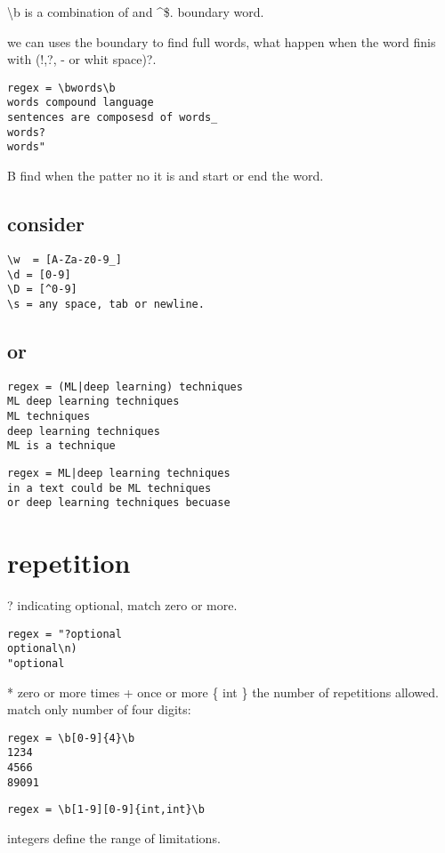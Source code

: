 \documentclass[10pt,a4paper]{article}
\begin{document}
\textbackslash b is a combination of  and  \textasciicircum\$. boundary word.

we can uses the boundary to find full words, what happen when the word finis with (!,?, - or whit space)?.
\begin{verbatim}
regex = \bwords\b
words compound language
sentences are composesd of words_
words?
words"
\end{verbatim}

\textbacklash B find when the patter no it is and start or end the word.





\subsection{consider}
\begin{verbatim}
\w  = [A-Za-z0-9_]
\d = [0-9]
\D = [^0-9]
\s = any space, tab or newline.
\end{verbatim}



\subsection{or}

\begin{verbatim}
regex = (ML|deep learning) techniques
ML deep learning techniques
ML techniques
deep learning techniques 
ML is a technique
\end{verbatim}


\begin{verbatim}
regex = ML|deep learning techniques
in a text could be ML techniques 
or deep learning techniques becuase 
\end{verbatim}


\section{repetition}
? indicating optional, match zero or more.
\begin{verbatim}
regex = "?optional
optional\n)
"optional
\end{verbatim}


* zero or more times
+ once or more
\{ int \} the number of repetitions allowed.
match only number of four digits:
\begin{verbatim}
regex = \b[0-9]{4}\b
1234
4566
89091
\end{verbatim}


\begin{verbatim}
regex = \b[1-9][0-9]{int,int}\b
\end{verbatim}
integers define the range of limitations.
\end{document}
